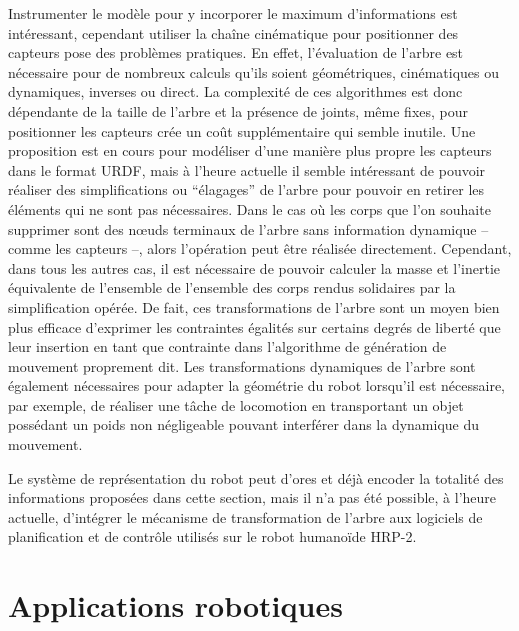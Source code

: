 Instrumenter le modèle pour y incorporer le maximum d'informations est
intéressant, cependant utiliser la chaîne cinématique pour positionner
des capteurs pose des problèmes pratiques. En effet, l'évaluation de
l'arbre est nécessaire pour de nombreux calculs qu'ils soient
géométriques, cinématiques ou dynamiques, inverses ou direct. La
complexité de ces algorithmes est donc dépendante de la taille de
l'arbre et la présence de joints, même fixes, pour positionner les
capteurs crée un coût supplémentaire qui semble inutile. Une
proposition est en cours pour modéliser d'une manière plus propre les
capteurs dans le format URDF, mais à l'heure actuelle il semble
intéressant de pouvoir réaliser des simplifications ou ``élagages'' de
l'arbre pour pouvoir en retirer les éléments qui ne sont pas
nécessaires. Dans le cas où les corps que l'on souhaite supprimer sont
des n\oe uds terminaux de l'arbre sans information dynamique -- comme
les capteurs --, alors l'opération peut être réalisée
directement. Cependant, dans tous les autres cas, il est nécessaire de
pouvoir calculer la masse et l'inertie équivalente de l'ensemble de
l'ensemble des corps rendus solidaires par la simplification
opérée. De fait, ces transformations de l'arbre sont un moyen bien
plus efficace d'exprimer les contraintes égalités sur certains degrés
de liberté que leur insertion en tant que contrainte dans l'algorithme
de génération de mouvement proprement dit. Les transformations
dynamiques de l'arbre sont également nécessaires pour adapter la
géométrie du robot lorsqu'il est nécessaire, par exemple, de réaliser
une tâche de locomotion en transportant un objet possédant un poids
non négligeable pouvant interférer dans la dynamique du mouvement.

Le système de représentation du robot peut d'ores et déjà encoder la
totalité des informations proposées dans cette section, mais il n'a
pas été possible, à l'heure actuelle, d'intégrer le mécanisme de
transformation de l'arbre aux logiciels de planification et de
contrôle utilisés sur le robot humanoïde HRP-2.


\section{Applications robotiques}


